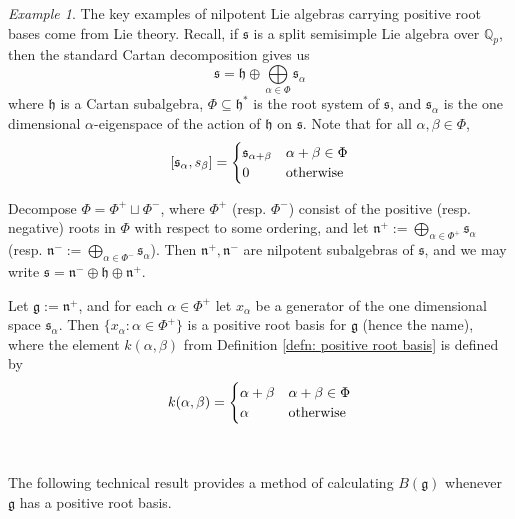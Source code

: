 \documentclass[12pt,a4paper]{article}
\let\\=\cr
\theoremstyle{definition}
\theoremstyle{remark}
\newtheorem{ex}[thm]{Example}
\theoremstyle{custthm}
\begin{document}
\begin{ex}
The key examples of nilpotent Lie algebras carrying positive root bases come from Lie theory. Recall, if $\mathfrak{s}$ is a split semisimple Lie algebra over $\mathbb{Q}_p$, then the standard Cartan decomposition gives us $$\mathfrak{s}=\mathfrak{h}\oplus\underset{\alpha\in\Phi}\bigoplus\mathfrak{s}_{\alpha}$$ where $\mathfrak{h}$ is a Cartan subalgebra, $\Phi\subseteq\mathfrak{h}^\ast$ is the root system of $\mathfrak{s}$, and $\mathfrak{s}_{\alpha}$ is the one dimensional $\alpha$-eigenspace of the action of $\mathfrak{h}$ on $\mathfrak{s}$. Note that for all $\alpha,\beta\in\Phi$, $$[\mathfrak{s}_{\alpha},s_{\mathfrak{\beta}}]=\begin{cases} \mathfrak{s}_{\alpha+\beta} & \alpha+\beta\in\Phi\\ 0 & \text{otherwise}\end{cases}$$

Decompose $\Phi=\Phi^+\sqcup\Phi^-$, where $\Phi^+$ (resp. $\Phi^{-}$) consist of the positive (resp. negative) roots in $\Phi$ with respect to some ordering, and let $\mathfrak{n}^+:=\underset{\alpha\in\Phi^+}{\bigoplus}\mathfrak{s}_{\alpha}$ (resp. $\mathfrak{n}^-:=\underset{\alpha\in\Phi^-}{\bigoplus}\mathfrak{s}_{\alpha}$). Then $\mathfrak{n}^+,\mathfrak{n}^-$ are nilpotent subalgebras of $\mathfrak{s}$, and we may write $\mathfrak{s}=\mathfrak{n}^-\oplus\mathfrak{h}\oplus\mathfrak{n}^+$.


Let $\mathfrak{g}:=\mathfrak{n}^+$, and for each $\alpha\in\Phi^+$ let $x_{\alpha}$ be a generator of the one dimensional space $\mathfrak{s}_{\alpha}$. Then $\{x_\alpha:\alpha\in\Phi^+\}$ is a positive root basis for $\mathfrak{g}$ (hence the name), where the element $k(\alpha,\beta)$ from Definition \ref{defn: positive root basis} is defined by $$k(\alpha,\beta)=\begin{cases}
\alpha+\beta & \alpha+\beta\in\Phi\\ \alpha & \text{otherwise}
\end{cases}$$
\end{ex}

\

The following technical result provides a method of calculating $B(\mathfrak{g})$ whenever $\mathfrak{g}$ has a positive root basis.
\end{document}
